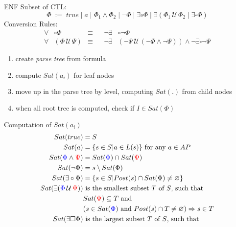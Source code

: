 \documentclass[a4paper, 10pt]{article}
\newcommand{\until}{\,\mathcal{U}\,}
\begin{document}
\begin{mdframed}[roundcorner=5pt,
subtitlebelowline=false,subtitleaboveline=false,
subtitlebackgroundcolor=blue!30,
frametitlerule=true,
frametitlebackgroundcolor=blue!30,
frametitle={ENF Conversion}
]
ENF Subset of CTL:
\[ \Phi\;:=\;true\;|\;a\;|\;\Phi_1\wedge\Phi_2\;|\;\neg\Phi\;|\;\exists\circ\Phi\;|\;\exists(\Phi_1\until\Phi_2\;|\;\exists\square\Phi) \]
Conversion Rules:
\begin{align*}
\forall&\circ\Phi &\equiv&& \neg\exists&\circ\neg\Phi \\
\forall&(\Phi\until\Psi) &\equiv&& \neg\exists&(\neg\Psi\until(\neg\Phi\wedge\neg\Psi))\wedge\neg\exists\square\neg\Psi
\end{align*}
\begin{multicols}{2}
\begin{enumerate}
    \item create \emph{parse tree} from formula
    \item compute $Sat(a_i)$ for leaf nodes
    \item move up in the parse tree by level, computing $Sat(.)$ from child nodes
    \item when all root tree is computed, check if $I\in Sat(\Phi)$
\end{enumerate}
\begin{center}
\scalebox{1}{}
\end{center}
\end{multicols}
Computation of $Sat(a_i)$
\begin{align*}
Sat(true) &= S \\
Sat(a) &= \{s\in S | a\in L(s)\} \text{ for any } a\in AP \\
Sat(\blue\Phi\wedge\red\Psi) &= Sat(\blue\Phi) \cap Sat(\red\Psi) \\
Sat(\neg\Phi) &= s\setminus Sat(\Phi) \\
Sat(\exists\circ\Phi) &= \{s\in S | Post(s)\cap Sat(\Phi)\not=\varnothing\} \\
%
Sat(\exists(\blue\Phi\until\red\Psi)) &\text{ is the smallest subset $T$ of $S$, such that } \\
&Sat(\red\Psi)\subseteq T \text{ and} \\
&(s\in Sat(\blue\Phi) \text{ and } Post(s)\cap T\not=\varnothing)\Rightarrow s\in T \\
%
Sat(\exists\square\Phi) &\text{ is the largest subset $T$ of $S$, such that} \\

\end{align*}
\end{mdframed}
\end{document}
